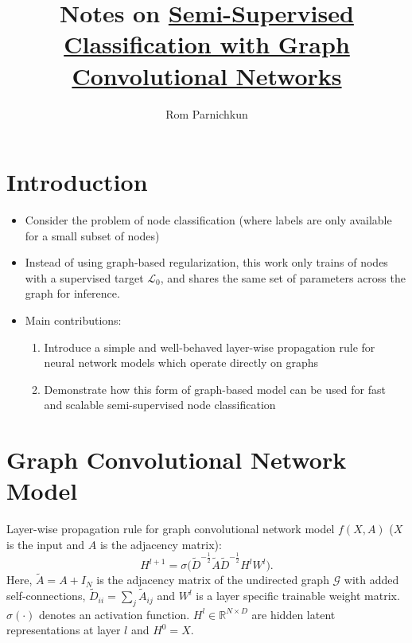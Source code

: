 \documentclass[twocolumn]{article}
\theoremstyle{plain}
\begin{document}
\title{Notes on \href{https://arxiv.org/pdf/1609.02907.pdf}{Semi-Supervised Classification with Graph Convolutional Networks}}
\author{Rom Parnichkun}

\maketitle

\section{Introduction}

\begin{itemize}
    \item Consider the problem of node classification (where labels are only available for a small subset of nodes)
    \item Instead of using graph-based regularization, this work only trains of nodes with a supervised target $\mathcal{L}_0$, and shares the same set of parameters across the graph for inference.
    \item Main contributions:
        \begin{enumerate}
            \item Introduce a simple and well-behaved layer-wise propagation rule for neural network models which operate directly on graphs
            \item Demonstrate how this form of graph-based model can be used for fast and scalable semi-supervised node classification
        \end{enumerate}
\end{itemize}

\section{Graph Convolutional Network Model}

Layer-wise propagation rule for graph convolutional network model $f(X,A)$ ($X$ is the input and $A$ is the adjacency matrix):
\begin{equation}
    H^{l+1} = \sigma\bigl(\tilde{D}^{-\frac{1}{2}}\tilde{A}\tilde{D}^{-\frac{1}{2}}H^l W^l \bigr).
\end{equation}
Here, $\tilde{A} = A + I_N$ is the adjacency matrix of the undirected graph $\mathcal{G}$ with added self-connections, $\tilde{D}_{ii} = \sum_j \tilde{A}_{ij}$ and $W^l$ is a layer specific trainable weight matrix. $\sigma(\cdot)$ denotes an activation function. $H^l \in \mathbb{R}^{N\times D}$ are hidden latent representations at layer $l$ and $H^0 = X$.
\end{document}
